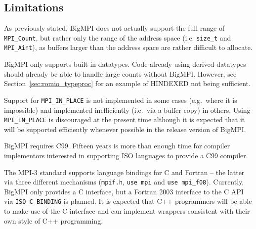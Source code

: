 
\subsection{Limitations}

As previously stated, BigMPI does not actually support the full
range of \texttt{MPI\_Count}, but rather only the range of the
address space (i.e. \texttt{size\_t} and \texttt{MPI\_Aint}), as buffers
larger than the address space are rather difficult to allocate.

BigMPI only supports built-in datatypes.  
Code already using derived-datatypes should already be able 
to handle large counts without BigMPI\@.
However, see Section~\ref{sec:romio_typeproc} 
for an example of HINDEXED not being sufficient.

Support for \texttt{MPI\_IN\_PLACE} is not 
implemented in some cases (e.g.\ where it is impossible) and 
implemented inefficiently (i.e.\ via a buffer copy) in others.
Using \texttt{MPI\_IN\_PLACE} is discouraged at the present time
although it is expected that it will be supported efficiently whenever
possible in the release version of BigMPI.

BigMPI requires C99.  Fifteen years is more than enough time for compiler 
implementors interested in supporting ISO languages to provide a C99
compiler.

The MPI-3 standard supports language bindings for C and Fortran --
the latter via three different mechanisms
(\texttt{mpif.h}, \texttt{use mpi} and \texttt{use mpi\_f08}).
Currently, BigMPI only provides a C interface, but a Fortran 2003
interface to the C API via \texttt{ISO\_C\_BINDING} is planned.
It is expected that C++ programmers will be able to make use of the
C interface and can implement wrappers consistent with their own
style of C++ programming.
